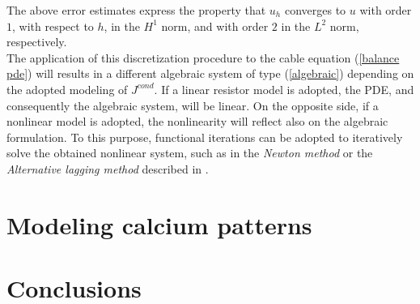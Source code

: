 \documentclass[12pt, a4paper]{report}
\begin{document}
The above error estimates express the property that $u_h$ converges to $u$ with order $1$, with respect to $h$, in the $H^1$ norm, and with order $2$ in the $L^2$ norm, respectively.\\
The application of this discretization procedure to the cable equation (\ref{balance pde}) will results in a different algebraic system of type (\ref{algebraic}) depending on the adopted modeling of  $J^{cond}$. If a linear resistor model is adopted, the PDE, and consequently the algebraic system, will be linear. On the opposite side, if a nonlinear model is adopted, the nonlinearity will reflect also on the algebraic formulation. To this purpose, functional iterations can be adopted to iteratively solve the obtained nonlinear system, such as in the \textit{Newton method} or the \textit{Alternative lagging method} described in \cite{35}.

\newpage

\chapter{Modeling calcium patterns}

\chapter{Conclusions}
\end{document}
